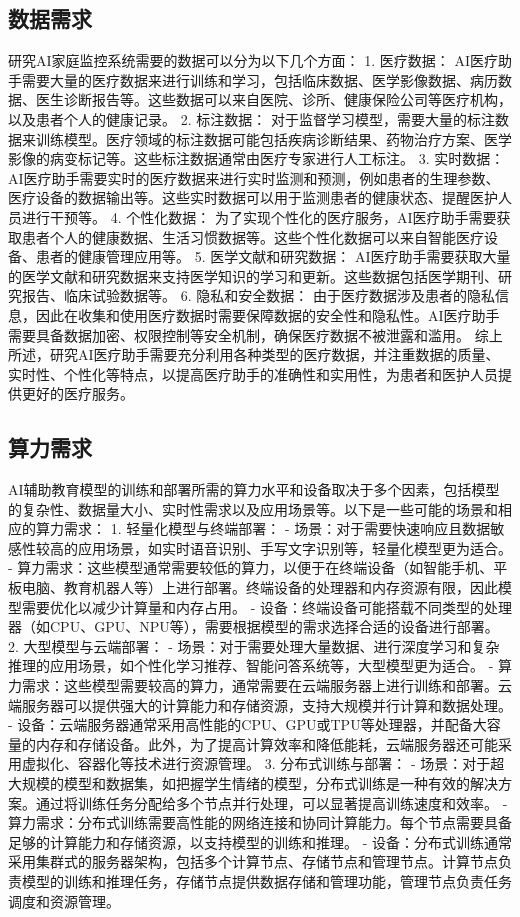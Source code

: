 \subsection{数据需求}
研究AI家庭监控系统需要的数据可以分为以下几个方面：
1. 医疗数据： AI医疗助手需要大量的医疗数据来进行训练和学习，包括临床数据、医学影像数据、病历数据、医生诊断报告等。这些数据可以来自医院、诊所、健康保险公司等医疗机构，以及患者个人的健康记录。
2. 标注数据： 对于监督学习模型，需要大量的标注数据来训练模型。医疗领域的标注数据可能包括疾病诊断结果、药物治疗方案、医学影像的病变标记等。这些标注数据通常由医疗专家进行人工标注。
3. 实时数据： AI医疗助手需要实时的医疗数据来进行实时监测和预测，例如患者的生理参数、医疗设备的数据输出等。这些实时数据可以用于监测患者的健康状态、提醒医护人员进行干预等。
4. 个性化数据： 为了实现个性化的医疗服务，AI医疗助手需要获取患者个人的健康数据、生活习惯数据等。这些个性化数据可以来自智能医疗设备、患者的健康管理应用等。
5. 医学文献和研究数据： AI医疗助手需要获取大量的医学文献和研究数据来支持医学知识的学习和更新。这些数据包括医学期刊、研究报告、临床试验数据等。
6. 隐私和安全数据： 由于医疗数据涉及患者的隐私信息，因此在收集和使用医疗数据时需要保障数据的安全性和隐私性。AI医疗助手需要具备数据加密、权限控制等安全机制，确保医疗数据不被泄露和滥用。
综上所述，研究AI医疗助手需要充分利用各种类型的医疗数据，并注重数据的质量、实时性、个性化等特点，以提高医疗助手的准确性和实用性，为患者和医护人员提供更好的医疗服务。
\subsection{算力需求}
AI辅助教育模型的训练和部署所需的算力水平和设备取决于多个因素，包括模型的复杂性、数据量大小、实时性需求以及应用场景等。以下是一些可能的场景和相应的算力需求：
1. 轻量化模型与终端部署：
  - 场景：对于需要快速响应且数据敏感性较高的应用场景，如实时语音识别、手写文字识别等，轻量化模型更为适合。
  - 算力需求：这些模型通常需要较低的算力，以便于在终端设备（如智能手机、平板电脑、教育机器人等）上进行部署。终端设备的处理器和内存资源有限，因此模型需要优化以减少计算量和内存占用。
  - 设备：终端设备可能搭载不同类型的处理器（如CPU、GPU、NPU等），需要根据模型的需求选择合适的设备进行部署。
2. 大型模型与云端部署：
  - 场景：对于需要处理大量数据、进行深度学习和复杂推理的应用场景，如个性化学习推荐、智能问答系统等，大型模型更为适合。
  - 算力需求：这些模型需要较高的算力，通常需要在云端服务器上进行训练和部署。云端服务器可以提供强大的计算能力和存储资源，支持大规模并行计算和数据处理。
  - 设备：云端服务器通常采用高性能的CPU、GPU或TPU等处理器，并配备大容量的内存和存储设备。此外，为了提高计算效率和降低能耗，云端服务器还可能采用虚拟化、容器化等技术进行资源管理。
3. 分布式训练与部署：
  - 场景：对于超大规模的模型和数据集，如把握学生情绪的模型，分布式训练是一种有效的解决方案。通过将训练任务分配给多个节点并行处理，可以显著提高训练速度和效率。
  - 算力需求：分布式训练需要高性能的网络连接和协同计算能力。每个节点需要具备足够的计算能力和存储资源，以支持模型的训练和推理。
  - 设备：分布式训练通常采用集群式的服务器架构，包括多个计算节点、存储节点和管理节点。计算节点负责模型的训练和推理任务，存储节点提供数据存储和管理功能，管理节点负责任务调度和资源管理。
